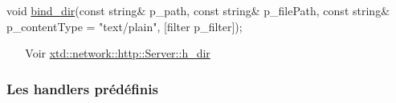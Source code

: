 \begin{DoxyItemize}
\item 
\begin{DoxyCode}
\textcolor{keywordtype}{void} \hyperlink{classxtd_1_1network_1_1http_1_1Server_a58cb8102e486dd24780b876561ae6c11}{bind\_dir}(\textcolor{keyword}{const} \textcolor{keywordtype}{string}& p\_path,
              \textcolor{keyword}{const} \textcolor{keywordtype}{string}& p\_filePath,
              \textcolor{keyword}{const} \textcolor{keywordtype}{string}& p\_contentType = \textcolor{stringliteral}{"text/plain"},
              [filter            p\_filter]);
\end{DoxyCode}
 ~\newline
~\newline
 Voir \hyperlink{classxtd_1_1network_1_1http_1_1Server_a7b7fb002ef005e7dd7b502c95587f4f2}{xtd\+::network\+::http\+::\+Server\+::h\+\_\+dir} ~\newline
~\newline

\end{DoxyItemize}

\subsubsection*{Les handlers prédéfinis }


